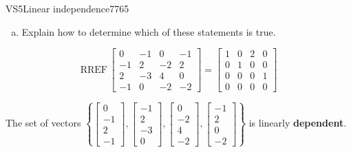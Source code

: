 \begin{exercise}{VS5}{Linear independence}{7765}
\begin{exerciseStatement}
\begin{enumerate}[(a)]
\begin{itemize}
 
\end{itemize}

     
\item  

 Explain how to determine which of these statements is true. 

 
\end{enumerate}

     \end{exerciseStatement}
 \begin{exerciseAnswer} 

 \[
\mathrm{RREF}\, \left[\begin{array}{cccc}
0 & -1 & 0 & -1 \\
-1 & 2 & -2 & 2 \\
2 & -3 & 4 & 0 \\
-1 & 0 & -2 & -2
\end{array}\right] = \left[\begin{array}{cccc}
1 & 0 & 2 & 0 \\
0 & 1 & 0 & 0 \\
0 & 0 & 0 & 1 \\
0 & 0 & 0 & 0
\end{array}\right]
            \] 

 

 The set of vectors \(\left\{ \left[\begin{array}{c}
0 \\
-1 \\
2 \\
-1
\end{array}\right] , \left[\begin{array}{c}
-1 \\
2 \\
-3 \\
0
\end{array}\right] , \left[\begin{array}{c}
0 \\
-2 \\
4 \\
-2
\end{array}\right] , \left[\begin{array}{c}
-1 \\
2 \\
0 \\
-2
\end{array}\right] \right\}\) is linearly \textbf{dependent}. 

 \end{exerciseAnswer}
 \end{exercise}


